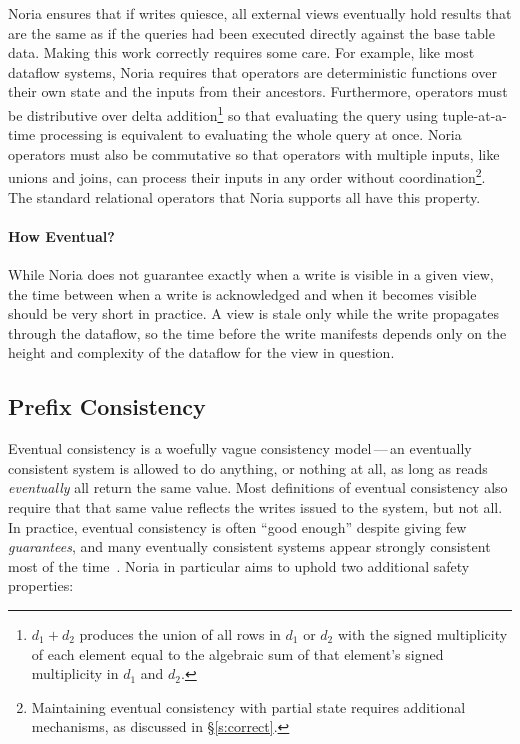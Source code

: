 Noria ensures that if writes quiesce, all external views eventually hold results
that are the same as if the queries had been executed directly against the base
table data. Making this work correctly requires some care. For example, like
most dataflow systems, Noria requires that operators are deterministic functions
over their own state and the inputs from their ancestors. Furthermore, operators
must be distributive over delta addition\footnote{$d_1 + d_2$ produces the union
of all rows in $d_1$ or $d_2$ with the signed multiplicity of each element equal
to the algebraic sum of that element's signed multiplicity in $d_1$ and $d_2$.}
so that evaluating the query using tuple-at-a-time processing is equivalent to
evaluating the whole query at once. Noria operators must also be commutative so
that operators with multiple inputs, like unions and joins, can process their
inputs in any order without coordination\footnote{Maintaining eventual
consistency with partial state requires additional mechanisms, as discussed in
\S\ref{s:correct}.}. The standard relational operators that Noria supports all
have this property.

\paragraph{How Eventual?}
While Noria does not guarantee exactly when a write is visible in a given view,
the time between when a write is acknowledged and when it becomes visible should
be very short in practice. A view is stale only while the write propagates
through the dataflow, so the time before the write manifests depends only on the
height and complexity of the dataflow for the view in question.

\subsection{Prefix Consistency}

Eventual consistency is a woefully vague consistency model\,---\,an eventually
consistent system is allowed to do anything, or nothing at all, as long as reads
\emph{eventually} all return the same value. Most definitions of eventual
consistency also require that that same value reflects the writes issued to the
system, but not all. In practice, eventual consistency is often ``good enough''
despite giving few \emph{guarantees}, and many eventually consistent systems
appear strongly consistent most of the time~\cite{eventual}. Noria in particular
aims to uphold two additional safety properties:

